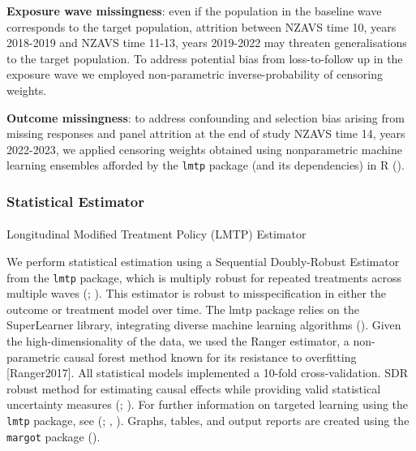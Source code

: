 \documentclass[
  single column]{article}
\makeatletter
\let\oldparagraph\paragraph
\renewcommand{\paragraph}{
    \@ifstar
      \xxxParagraphStar
      \xxxParagraphNoStar
  }
\newcommand{\xxxParagraphStar}[1]{\oldparagraph*{#1}\mbox{}}
\newcommand{\xxxParagraphNoStar}[1]{\oldparagraph{#1}\mbox{}}
\makeatother
\begin{document}
\textbf{Exposure wave missingness}: even if the population in the
baseline wave corresponds to the target population, attrition between
NZAVS time 10, years 2018-2019 and NZAVS time 11-13, years 2019-2022 may
threaten generalisations to the target population. To address potential
bias from loss-to-follow up in the exposure wave we employed
non-parametric inverse-probability of censoring weights.

\textbf{Outcome missingness}: to address confounding and selection bias
arising from missing responses and panel attrition at the end of study
NZAVS time 14, years 2022-2023, we applied censoring weights obtained
using nonparametric machine learning ensembles afforded by the
\texttt{lmtp} package (and its dependencies) in R
().

\subsubsection{Statistical Estimator}\label{statistical-estimator}

\paragraph{Longitudinal Modified Treatment Policy (LMTP)
Estimator}\label{longitudinal-modified-treatment-policy-lmtp-estimator}

We perform statistical estimation using a Sequential Doubly-Robust
Estimator from the \texttt{lmtp} package, which is multiply robust for
repeated treatments across multiple waves
(;
). This estimator
is robust to misspecification in either the outcome or treatment model
over time. The lmtp package relies on the SuperLearner library,
integrating diverse machine learning algorithms
(). Given the
high-dimensionality of the data, we used the Ranger estimator, a
non-parametric causal forest method known for its resistance to
overfitting {[}Ranger2017{]}. All statistical models implemented a
10-fold cross-validation. SDR robust method for estimating causal
effects while providing valid statistical uncertainty measures
(;
). For further
information on targeted learning using the \texttt{lmtp} package, see
(;
,
). Graphs, tables, and output reports
are created using the \texttt{margot} package
().
\end{document}
